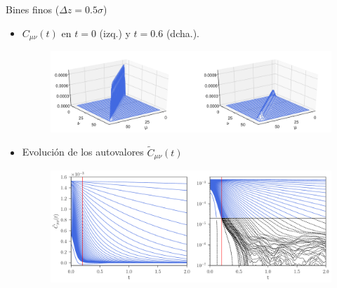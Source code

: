 \documentclass{beamer}
\newcommand{\esc}{\!\cdot\!}
\begin{document}
%

\begin{frame}{Bines finos ($\Delta z=0.5\sigma$)}
  \begin{itemize}
    \item<1-> $C_{\mu\nu}(t)$ en  $t=0$ (izq.) y $t=0.6$ (dcha.).
\begin{figure}[h!]
\includegraphics[width=\linewidth]{Ct-matrix-WALLS-66nodes}
\end{figure}
\item<2-> Evolución de los autovalores $\tilde{C}_{\mu\nu}(t)$
\begin{figure}[h!]
  \includegraphics[width=\linewidth]{CtRec-WALLS-66nodes-exp}
\end{figure}
\end{itemize}
\end{frame}
\end{document}
